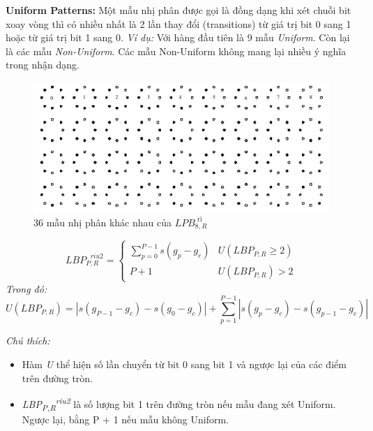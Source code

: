 \textbf{Uniform Patterns:} Một mẫu nhị phân được gọi là đồng dạng khi xét chuỗi bit xoay vòng thì có nhiều nhất là 2 lần thay đổi (transitions) từ giá trị bit 0 sang 1 hoặc từ giá trị bit 1 sang 0. 
\textit{Ví dụ: }Với hàng đầu tiên là 9 mẫu \textit{Uniform}. Còn lại là các mẫu \textit{Non-Uniform}. Các mẫu Non-Uniform không mang lại nhiều ý nghĩa trong nhận dạng.
\begin{figure}[H]
	\begin{center}
		\includegraphics[scale=0.4]{images/theo1/uniform_exam}
		\caption{36 mẫu nhị phân khác nhau của $LPB_{8,R}^{\text{  ri}}$}
	\end{center}
\end{figure}

\begin{equation}
	LBP_{P,R}^{\text{  }riu2}=\begin{cases}
		\sum_{p=0}^{P-1}{s(g_p-g_c)}  & U(LBP_{P,R}\geq 2)\\
		P + 1 & U(LBP_{P,R}) > 2
	\end{cases}
\end{equation}
\textit{Trong đó:}
$$
	U(LBP_{P,R})=\left\lvert s(g_{P-1} - g_c)-s(g_0-g_c)\right\rvert + \sum_{p=1}^{P-1}{\left\lvert s(g_p - g_c)-s(g_{p-1}-g_c)\right\rvert}
$$

\textit{Chú thích:} 
\begin{itemize}
	\item Hàm \textit{U} thể hiện số lần chuyển từ bit 0 sang bit 1 và ngược lại của các điểm trên đường tròn.
	\item \textit{LBP\textsubscript{P,R}\textsuperscript{riu2}} là số lượng bit 1 trên đường tròn nếu mẫu đang xét Uniform. Ngược lại, bằng P + 1 nếu mẫu không Uniform.
\end{itemize}
\pagebreak

